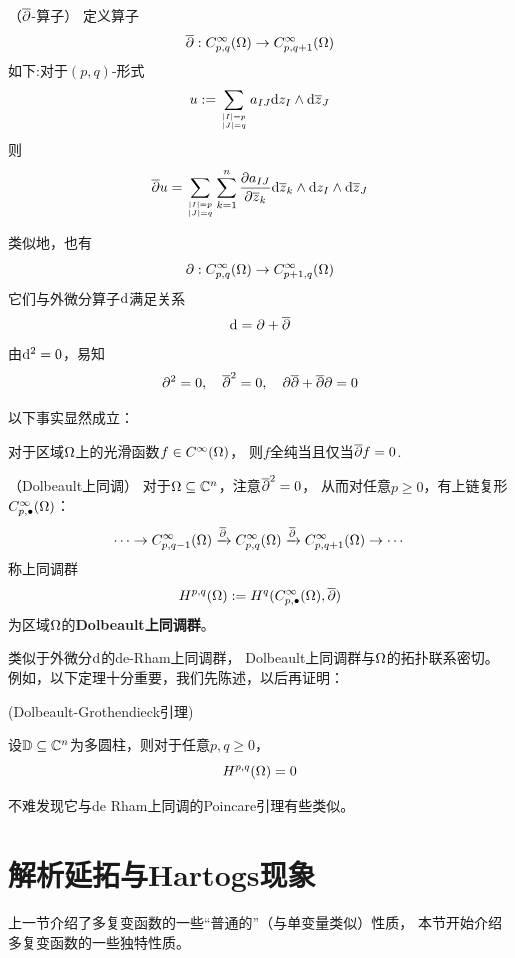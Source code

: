 \begin{notation}（$\overline{\partial}$-算子）
定义算子
$$\overline{\partial}: C^\infty_{p,q}(\Omega)\to C^\infty_{p,q+1}(\Omega)$$
如下:对于$(p,q)$-形式
$$u:=\sum_{|I|=p\atop|J|=q}
a_{IJ}\mathrm{d} z_I\wedge\mathrm{d}\overline{z}_J$$
则
$$
  \overline{\partial} u=
  \sum_{|I|=p\atop|J|=q}
    \sum_{k=1}^n
      \frac{\partial a_{IJ}} {\partial \overline{z}_k}
      \mathrm{d} \overline{z}_k\wedge\mathrm{d} z_I\wedge\mathrm{d}\overline{z}_J
$$
\end{notation}
类似地，也有
$$\partial:C_{p,q}^\infty(\Omega)\to C_{p+1,q}^\infty(\Omega)$$
它们与外微分算子$\mathrm{d}$满足关系
$$\mathrm{d}=\partial+\overline{\partial}$$
由$\mathrm{d}^2=0$，易知
$$\partial^2=0,\quad \overline{\partial}^2=0,\quad \partial\overline{\partial}+\overline{\partial}\partial=0$$

以下事实显然成立：
\begin{lemma}
对于区域$\Omega$上的光滑函数$f\in C^\infty(\Omega)$，
则$f$全纯当且仅当$\overline{\partial} f=0$.
\end{lemma}

\begin{rem}（Dolbeault上同调）
对于$\Omega\subseteq\mathbb{C}^n$，注意$\overline{\partial}^2=0$，
从而对任意$p\geq 0$，有上链复形$C^\infty_{p,\bullet}(\Omega)$：
$$
  \cdots\to
  C^\infty_{p,q-1}(\Omega)
  \xrightarrow{\overline{\partial}}C^\infty_{p,q}(\Omega)
  \xrightarrow{\overline{\partial}}C^\infty_{p,q+1}(\Omega)
  \to\cdots
$$
称上同调群
$$H^{p,q}(\Omega):=H^q(C^\infty_{p,\bullet}(\Omega),\overline{\partial})$$
为区域$\Omega$的\textbf{Dolbeault上同调群}。
\end{rem}
类似于外微分$\mathrm{d}$的de-Rham上同调群，
Dolbeault上同调群与$\Omega$的拓扑联系密切。
例如，以下定理十分重要，我们先陈述，以后再证明：

\begin{lemma}(Dolbeault-Grothendieck引理)

设$\mathbb{D}\subseteq\mathbb{C}^n$为多圆柱，则对于任意$p,q\geq 0$，
$$H^{p,q}(\Omega)=0$$
\end{lemma}

不难发现它与de Rham上同调的Poincare引理有些类似。

\section{解析延拓与Hartogs现象}
上一节介绍了多复变函数的一些“普通的”（与单变量类似）性质，
本节开始介绍多复变函数的一些独特性质。

